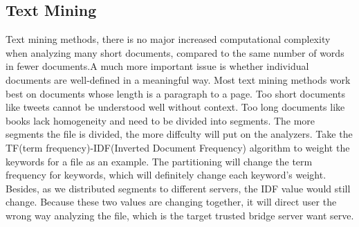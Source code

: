 \subsection{Text Mining}

Text mining methods, there is no major increased computational complexity when analyzing many short documents, compared to the same number of words in fewer documents.A much more important issue is whether individual documents are well-defined in a meaningful way. Most text mining methods work best on documents whose length is a paragraph to a page. Too short documents like tweets cannot be understood well without context. Too long documents like books lack homogeneity and need to be divided into segments. The more segments the file is divided, the more diffculty will put on the analyzers. Take the TF(term frequency)-IDF(Inverted Document Frequency) algorithm to weight the keywords for a file as an example. The partitioning will change the term frequency for keywords, which will definitely change each keyword's weight. Besides, as we distributed segments to different servers, the IDF value would still change. Because these two values are changing together, it will direct user the wrong way analyzing the file, which is the target trusted bridge server want serve.
